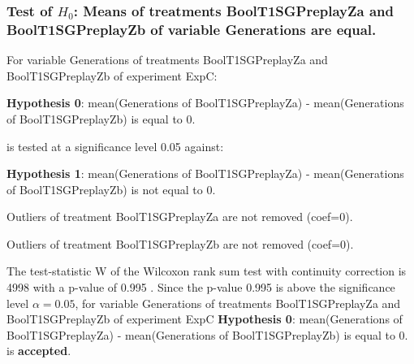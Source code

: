 \begin{frame}[t]
 \frametitle{Test of $H_{0}$: Means of treatments BoolT1SGPreplayZa and BoolT1SGPreplayZb of variable Generations are equal. }
 \scriptsize
 For variable Generations of treatments BoolT1SGPreplayZa and BoolT1SGPreplayZb of experiment ExpC:

\vspace{1mm}
{\bf Hypothesis 0}: mean(Generations of BoolT1SGPreplayZa) - mean(Generations of BoolT1SGPreplayZb) is equal to 0.


 \begin{center} is tested at a significance level 0.05 against: \end{center}

{\bf Hypothesis 1}: mean(Generations of BoolT1SGPreplayZa) - mean(Generations of BoolT1SGPreplayZb) is not equal to 0.
\vspace{1mm}
\vspace{1mm}

 Outliers of treatment BoolT1SGPreplayZa  are not removed (coef=0).

 Outliers of treatment BoolT1SGPreplayZb  are not removed (coef=0).
\vspace{1mm}
 
 The test-statistic W of the Wilcoxon rank sum test with continuity correction is 4998 with a p-value of 0.995 .
 Since the p-value 0.995 is above the significance level $\alpha= 0.05 $,
 for variable Generations of treatments BoolT1SGPreplayZa and BoolT1SGPreplayZb of experiment ExpC 
 {\bf Hypothesis 0}: mean(Generations of BoolT1SGPreplayZa) - mean(Generations of BoolT1SGPreplayZb) is equal to 0.
is {\bf accepted}.

 \end{frame}
